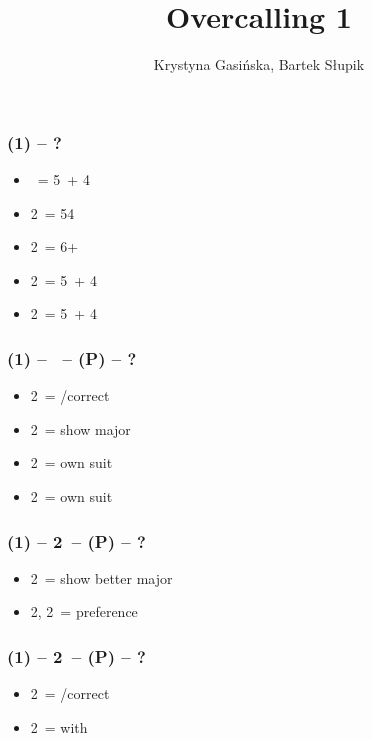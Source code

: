 \documentclass[12pt, a4paper]{article}
\title{Overcalling 1\ntx}
\author{Krystyna Gasińska, Bartek Słupik}
\begin{document}
\maketitle


\subsubsection*{(1\ntx) -- ?}
\begin{itemize}
    \item \dbl\ = 5\minor\ + 4\major
    \item 2\clubs\ = 54 \major
    \item 2\diams\ = 6+ \major
    \item 2\hearts\ = 5\hearts\ + 4\minor
    \item 2\spades\ = 5\spades\ + 4\minor
\end{itemize}

\subsubsection*{(1\ntx) -- \dbl\ -- (P) -- ?}
\begin{itemize}
    \item 2\clubs\ = \pass/correct
    \item 2\diams\ = show major
    \item 2\hearts\ = own suit
    \item 2\spades\ = own suit
\end{itemize}

\subsubsection*{(1\ntx) -- 2\clubs\ -- (P) -- ?}
\begin{itemize}
    \item 2\diams\ = show better major
    \item 2\hearts, 2\spades\ = preference
\end{itemize}

\subsubsection*{(1\ntx) -- 2\diams\ -- (P) -- ?}
\begin{itemize}
    \item 2\hearts\ = \pass/correct
    \item 2\spades\ = \inv with \hearts
\end{itemize}

\end{document}
